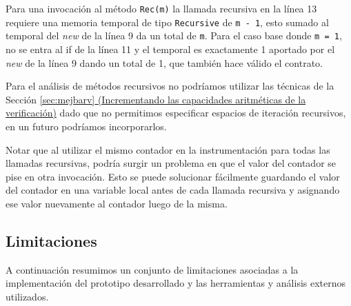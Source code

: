 \documentclass[12pt,a4paper]{article}
\newcommand\mono[1]{\texttt{#1}}
\begin{document}
			Para una invocación al método \mono{Rec(m)} la llamada recursiva en la línea 13 requiere una memoria temporal de tipo \mono{Recursive} de \mono{m - 1}, esto sumado al temporal del \textit{new} de la línea 9 da un total de \mono{m}. Para el caso base donde \mono{m = 1}, no se entra al if de la línea 11 y el temporal es exactamente 1 aportado por el \textit{new} de la línea 9 dando un total de 1, que también hace válido el contrato.

			Para el análisis de métodos recursivos no podríamos utilizar las técnicas de la Sección \hyperref[sec:mejbarv]{\ref*{sec:mejbarv} (Incrementando las capacidades aritméticas de la verificación)} dado que no permitimos especificar espacios de iteración recursivos, en un futuro podríamos incorporarlos.

			Notar que al utilizar el mismo contador en la instrumentación para todas las llamadas recursivas, podría surgir un problema en que el valor del contador se pise en otra invocación. Esto se puede solucionar fácilmente guardando el valor del contador en una variable local antes de cada llamada recursiva y asignando ese valor nuevamente al contador luego de la misma.

		\subsection{Limitaciones}
			A continuación resumimos un conjunto de limitaciones asociadas a la implementación del prototipo desarrollado y las herramientas y análisis externos utilizados.
\end{document}
